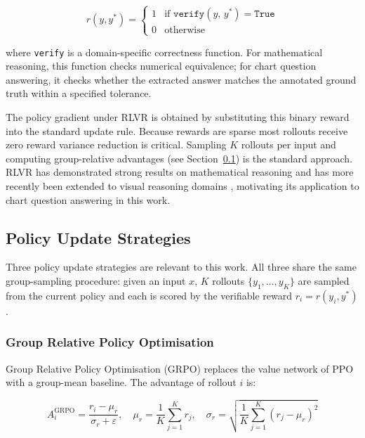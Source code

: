 \documentclass{iutbscthesis}
\begin{document}
\begin{equation}
    r(y, y^*) = \begin{cases}
        1 & \text{if } \texttt{verify}(y,\, y^*) = \texttt{True} \\
        0 & \text{otherwise}
    \end{cases}
\end{equation}

\noindent where \texttt{verify} is a domain-specific correctness function. For mathematical
reasoning, this function checks numerical equivalence; for chart question answering,
it checks whether the extracted answer matches the annotated ground truth within a
specified tolerance.

The policy gradient under RLVR is obtained by substituting this binary reward into
the standard update rule. Because rewards are sparse most rollouts receive zero
reward variance reduction is critical. Sampling $K$ rollouts per input and computing
group-relative advantages (see Section~\ref{sec:policy_strategies}) is the standard
approach. RLVR has demonstrated strong results on mathematical reasoning
\cite{shao2024deepseekmath} and has more recently been extended to visual reasoning
domains \cite{yang2025r1v}, motivating its application to chart question answering
in this work.

\subsection{Policy Update Strategies}
\label{sec:policy_strategies}

Three policy update strategies are relevant to this work. All three share the same
group-sampling procedure: given an input $x$, $K$ rollouts
$\{y_1, \ldots, y_K\}$ are sampled from the current policy and each is scored by the
verifiable reward $r_i = r(y_i, y^*)$.

\subsubsection{Group Relative Policy Optimisation}

Group Relative Policy Optimisation (GRPO) \cite{shao2024deepseekmath} replaces the
value network of PPO with a group-mean baseline. The advantage of rollout $i$ is:

\begin{equation}
    A_i^{\text{GRPO}} = \frac{r_i - \mu_r}{\sigma_r + \varepsilon},
    \quad \mu_r = \frac{1}{K}\sum_{j=1}^K r_j,
    \quad \sigma_r = \sqrt{\frac{1}{K}\sum_{j=1}^K (r_j - \mu_r)^2}
\end{equation}
\end{document}

